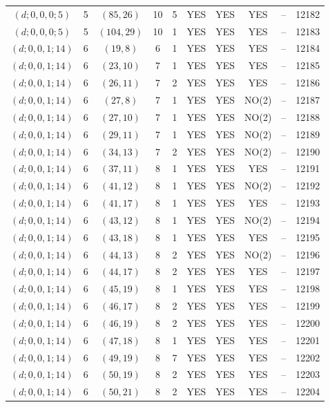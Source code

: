 \begin{longtable}{|c|c|c|c|c|c|c|c|c|c|}
$(d; 0, 0, 0; 5)$ & 5 & $(85, 26)$ & 10 & 5 & YES & YES & YES & -- & 12182\\
$(d; 0, 0, 0; 5)$ & 5 & $(104, 29)$ & 10 & 1 & YES & YES & YES & -- & 12183\\
$(d; 0, 0, 1; 14)$ & 6 & $(19, 8)$ & 6 & 1 & YES & YES & YES & -- & 12184\\
$(d; 0, 0, 1; 14)$ & 6 & $(23, 10)$ & 7 & 1 & YES & YES & YES & -- & 12185\\
$(d; 0, 0, 1; 14)$ & 6 & $(26, 11)$ & 7 & 2 & YES & YES & YES & -- & 12186\\
$(d; 0, 0, 1; 14)$ & 6 & $(27, 8)$ & 7 & 1 & YES & YES & NO(2) & -- & 12187\\
$(d; 0, 0, 1; 14)$ & 6 & $(27, 10)$ & 7 & 1 & YES & YES & NO(2) & -- & 12188\\
$(d; 0, 0, 1; 14)$ & 6 & $(29, 11)$ & 7 & 1 & YES & YES & NO(2) & -- & 12189\\
$(d; 0, 0, 1; 14)$ & 6 & $(34, 13)$ & 7 & 2 & YES & YES & NO(2) & -- & 12190\\
$(d; 0, 0, 1; 14)$ & 6 & $(37, 11)$ & 8 & 1 & YES & YES & YES & -- & 12191\\
$(d; 0, 0, 1; 14)$ & 6 & $(41, 12)$ & 8 & 1 & YES & YES & NO(2) & -- & 12192\\
$(d; 0, 0, 1; 14)$ & 6 & $(41, 17)$ & 8 & 1 & YES & YES & YES & -- & 12193\\
$(d; 0, 0, 1; 14)$ & 6 & $(43, 12)$ & 8 & 1 & YES & YES & NO(2) & -- & 12194\\
$(d; 0, 0, 1; 14)$ & 6 & $(43, 18)$ & 8 & 1 & YES & YES & YES & -- & 12195\\
$(d; 0, 0, 1; 14)$ & 6 & $(44, 13)$ & 8 & 2 & YES & YES & NO(2) & -- & 12196\\
$(d; 0, 0, 1; 14)$ & 6 & $(44, 17)$ & 8 & 2 & YES & YES & YES & -- & 12197\\
$(d; 0, 0, 1; 14)$ & 6 & $(45, 19)$ & 8 & 1 & YES & YES & YES & -- & 12198\\
$(d; 0, 0, 1; 14)$ & 6 & $(46, 17)$ & 8 & 2 & YES & YES & YES & -- & 12199\\
$(d; 0, 0, 1; 14)$ & 6 & $(46, 19)$ & 8 & 2 & YES & YES & YES & -- & 12200\\
$(d; 0, 0, 1; 14)$ & 6 & $(47, 18)$ & 8 & 1 & YES & YES & YES & -- & 12201\\
$(d; 0, 0, 1; 14)$ & 6 & $(49, 19)$ & 8 & 7 & YES & YES & YES & -- & 12202\\
$(d; 0, 0, 1; 14)$ & 6 & $(50, 19)$ & 8 & 2 & YES & YES & YES & -- & 12203\\
$(d; 0, 0, 1; 14)$ & 6 & $(50, 21)$ & 8 & 2 & YES & YES & YES & -- & 12204\\

\end{longtable}

